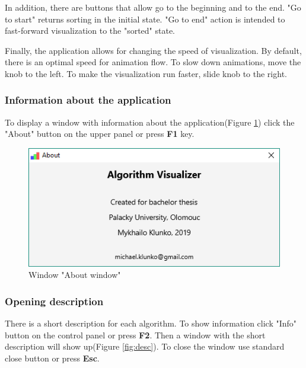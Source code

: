 \documentclass[
  field=inf,
  biblatex,
  language=english,
  glossaries,
  theorems=false,
  sourcecodes=false,
  index
]{kidiplom}
\begin{document}
In addition, there are buttons that allow go to the beginning and to the end. "Go to start" returns sorting in the initial state. "Go to end" action is intended to fast-forward visualization to the "sorted" state.

Finally, the application allows for changing the speed of visualization. By default, there is an optimal speed for animation flow. To slow down animations, move the knob to the left. To make the visualization run faster, slide knob to the right.

\subsubsection{Information about the application}

To display a window with information about the application(Figure \ref{fig:about}) click the "About" button on the upper panel or press \textbf{F1} key.

\begin{figure}[H]
\begin{center}
	\includegraphics[scale=0.7]{img/ui/WindowAbout.PNG}
	\caption{Window "About window"}\label{fig:about}
\end{center}
\end{figure}

\subsubsection{Opening description}

There is a short description for each algorithm. To show information click "Info" button on the control panel or press \textbf{F2}. Then a window with the short description will show up(Figure \ref{fig:desc}). To close the window use standard close button or press \textbf{Esc}.
\end{document}

